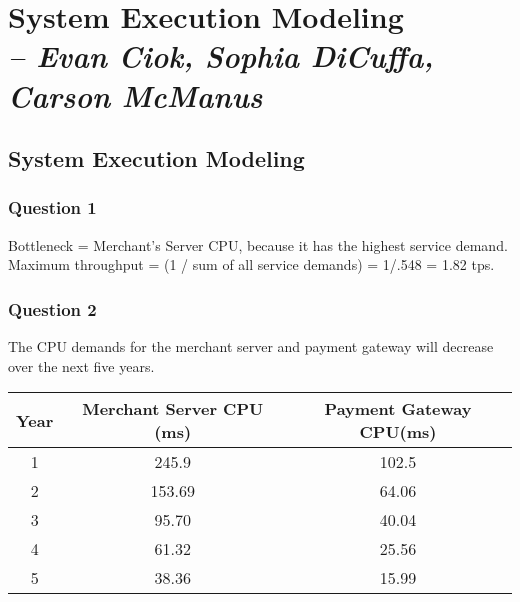 \chapter{System Execution Modeling \\
  \small{\textit{-- Evan Ciok, Sophia DiCuffa, Carson McManus}}
  \label{Chapter::LabThree}}


\section{System Execution Modeling \label{Section::LabThree}}

\subsection{Question 1}
Bottleneck = Merchant’s Server CPU, because it has the highest service demand.
Maximum throughput = (1 / sum of all service demands) = 1/.548 = 1.82 tps.

\subsection{Question 2}
The CPU demands for the merchant server and payment gateway will decrease over the next five years.
\begin{center}
  \begin{tabular}{ |c|c|c| }
    \hline
    Year & Merchant Server CPU (ms) & Payment Gateway CPU(ms) \\
    \hline
    1    & 245.9                   & 102.5                   \\
    \hline
    2    & 153.69                   & 64.06               \\
    \hline
    3    & 95.70                   & 40.04                  \\
    \hline
    4    &  61.32                    & 25.56                  \\
    \hline
    5    & 38.36                  & 15.99                   \\
    \hline
  \end{tabular}
\end{center}

